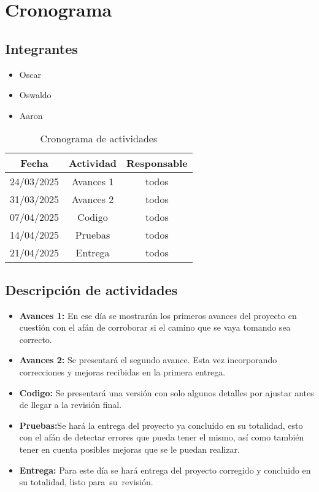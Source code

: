 \section*{Cronograma}

\subsection*{Integrantes}
\begin{itemize}
    \item Oscar
    \item Oswaldo
    \item Aaron
\end{itemize}

    \begin{table}[h]
        \begin{center}
            \begin{tabular}{| c | c  | c |}
                \hline
                Fecha & Actividad & Responsable \\
                \hline
                24/03/2025 & Avances 1 & todos \\
                \hline
                31/03/2025 & Avances 2 & todos \\
                \hline
                07/04/2025 & Codigo & todos \\
                \hline
                14/04/2025 & Pruebas & todos \\
                \hline
                21/04/2025 & Entrega & todos \\
                \hline
            \end{tabular}
        \caption{Cronograma de actividades}
        \end{center}
    \end{table}
\subsection*{Descripción de actividades}

\begin{itemize}
    \item \textbf{Avances 1:} En ese día se mostrarán los primeros avances del proyecto en cuestión con el afán de corroborar si el camino que se vaya tomando sea correcto.
    \item \textbf{Avances 2:} Se presentará el segundo avance. Esta vez incorporando correcciones y mejoras recibidas en la primera entrega.
    \item \textbf{Codigo:} Se presentará una versión con solo algunos detalles por ajustar antes de llegar a la revisión final.
    \item \textbf{Pruebas:}Se hará la entrega del proyecto ya concluido en su totalidad, esto con el afán de detectar errores que pueda tener el mismo, así como también tener en cuenta posibles mejoras que se le puedan realizar.
    \item \textbf{Entrega:} Para este día se hará entrega del proyecto corregido y concluido en su totalidad, listo para su revisión.
\end{itemize}
